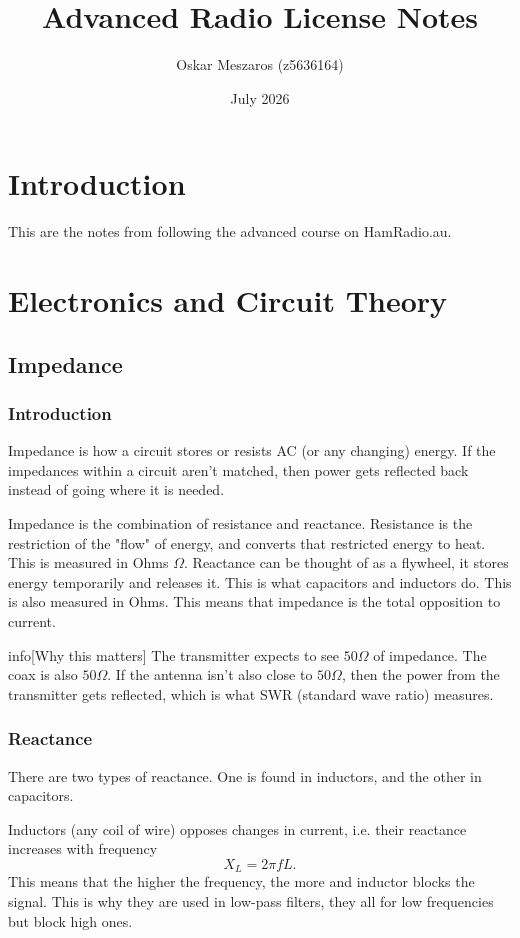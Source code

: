 \documentclass{article}
\title{Advanced Radio License Notes}
\author{Oskar Meszaros (z5636164)}
\date{July 2026}
\begin{document}
\maketitle

\tableofcontents

\section{Introduction}
This are the notes from following the advanced course on HamRadio.au.

\section{Electronics and Circuit Theory}
\subsection{Impedance}
\subsubsection{Introduction}
Impedance is how a circuit stores or resists AC (or any changing) energy. If the impedances within a circuit aren't matched, then power gets reflected back instead of going where it is needed.

Impedance is the combination of resistance and reactance. Resistance is the restriction of the "flow" of energy, and converts that restricted energy to heat. This is measured in Ohms $\Omega $. Reactance can be thought of as a flywheel, it stores energy temporarily and releases it. This is what capacitors and inductors do. This is also measured in Ohms. This means that impedance is the total opposition to current.
\begin{callout}{info}[Why this matters]
The transmitter expects to see $50\Omega $ of impedance. The coax is also $50\Omega $. If the antenna isn't also close to $50\Omega $, then the power from the transmitter gets reflected, which is what SWR (standard wave ratio) measures.
\end{callout}

\subsubsection{Reactance}
There are two types of reactance. One is found in inductors, and the other in capacitors.

Inductors (any coil of wire) opposes changes in current, i.e. their reactance increases with frequency
\[
    X_L=2\pi fL.
\]
This means that the higher the frequency, the more and inductor blocks the signal. This is why they are used in low-pass filters, they all for low frequencies but block high ones.
\end{document}
